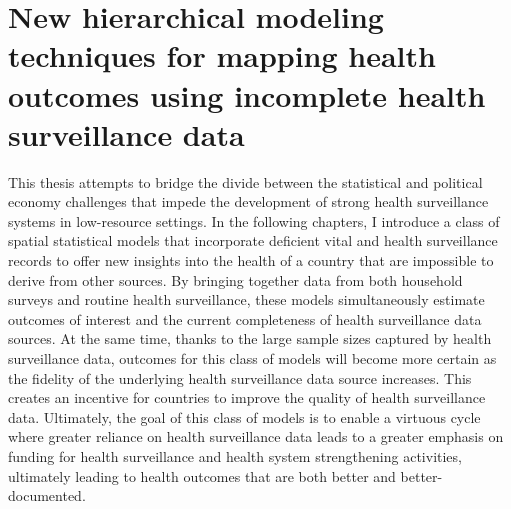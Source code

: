 \documentclass[
]{article}
\begin{document}
\hypertarget{new-hierarchical-modeling-techniques-for-mapping-health-outcomes-using-incomplete-health-surveillance-data}{%
\section{New hierarchical modeling techniques for mapping health outcomes using incomplete health surveillance data}\label{new-hierarchical-modeling-techniques-for-mapping-health-outcomes-using-incomplete-health-surveillance-data}}

This thesis attempts to bridge the divide between the statistical and political economy challenges that impede the development of strong health surveillance systems in low-resource settings. In the following chapters, I introduce a class of spatial statistical models that incorporate deficient vital and health surveillance records to offer new insights into the health of a country that are impossible to derive from other sources. By bringing together data from both household surveys and routine health surveillance, these models simultaneously estimate outcomes of interest and the current completeness of health surveillance data sources. At the same time, thanks to the large sample sizes captured by health surveillance data, outcomes for this class of models will become more certain as the fidelity of the underlying health surveillance data source increases. This creates an incentive for countries to improve the quality of health surveillance data. Ultimately, the goal of this class of models is to enable a virtuous cycle where greater reliance on health surveillance data leads to a greater emphasis on funding for health surveillance and health system strengthening activities, ultimately leading to health outcomes that are both better and better-documented.
\end{document}
